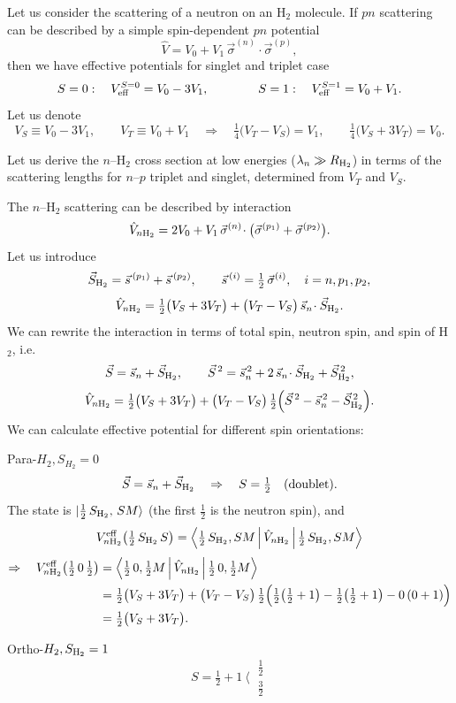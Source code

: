 \documentclass[11pt,a4paper]{article}
\newcommand{\op}[1]{\hat{#1}}
\begin{document}
Let us consider the scattering of a neutron on an H$_2$ molecule. If $pn$ scattering can be described by a simple spin-dependent $pn$ potential
\[
\op V=V_0+V_1\,\vec\sigma^{(n)}\!\cdot\vec\sigma^{(p)} , 
\]
then we have effective potentials for singlet and triplet case 
\[
S=0:\quad V_{\rm eff}^{S=0}=V_0-3V_1,
\qquad\qquad
S=1:\quad V_{\rm eff}^{S=1}=V_0+V_1 .
\]
Let us denote
\[
V_S\equiv V_0-3V_1,\qquad V_T\equiv V_0+V_1
\quad\Rightarrow\quad
\tfrac14\big(V_T-V_S\big)=V_1,\qquad
\tfrac14\big(V_S+3V_T\big)=V_0 .
\]

Let us derive the $n$--H$_2$ cross section at low energies
($\lambda_n\gg R_{\rm H_2}$) in terms of the scattering lengths for $n$--$p$
triplet and singlet, determined from $V_T$ and $V_S$.

The $n$--H$_2$ scattering can be described by interaction
\[
\op V_{n\rm H_2}=2V_0+V_1\,\vec\sigma^{(n)}\!\cdot\big(\vec\sigma^{(p_1)}+\vec\sigma^{(p_2)}\big).
\]
Let us introduce
\[
\vec S_{\rm H_2}=\vec s^{\,(p_1)}+\vec s^{\,(p_2)},
\qquad
\vec s^{\,(i)}=\tfrac12\,\vec\sigma^{(i)},\quad i=n,p_1,p_2,
\]
\[
\op V_{n\rm H_2}=\tfrac12\big(V_S+3V_T\big)+\big(V_T-V_S\big)\,\vec s_n\!\cdot\vec S_{\rm H_2} .
\]
We can rewrite the interaction in terms of total spin, neutron spin, and spin of H$_2$, i.e. 
\[
\vec S=\vec s_n+\vec S_{\rm H_2},
\qquad
\vec S^{\,2}=\vec s_n^{\,2}+2\,\vec s_n\!\cdot\vec S_{\rm H_2}+\vec S_{\rm H_2}^{\,2},
\]
\[
\op V_{n\rm H_2}=\tfrac12\big(V_S+3V_T\big)
+\big(V_T-V_S\big)\,\tfrac12\Big(\vec S^{\,2}-\vec s_n^{\,2}-\vec S_{\rm H_2}^{\,2}\Big).
\]
We can calculate effective potential for different spin orientations:

Para-$H_2, S_{H_2}=0$
\[
\vec S=\vec s_n+\vec S_{\rm H_2}\quad\Rightarrow\quad S=\tfrac12\quad\text{(doublet)}.
\]
The state is $\ket{\tfrac12\,S_{\rm H_2},\,SM}$ (the first $\tfrac12$ is the
neutron spin), and
\[
V^{\rm eff}_{n\rm H_2}\big(\tfrac12\,S_{\rm H_2}\,S\big)
=\Braket{\tfrac12\,S_{\rm H_2},SM|\op V_{n\rm H_2}|\tfrac12\,S_{\rm H_2},SM}
\]
\begin{align*}
\Rightarrow\quad
V^{\rm eff}_{n\rm H_2}\big(\tfrac12\,0\,\tfrac12\big)
&=\Braket{\tfrac12\,0,\tfrac12M|\op V_{n\rm H_2}|\tfrac12\,0,\tfrac12M}\\
&=\tfrac12\big(V_S+3V_T\big)+\big(V_T-V_S\big)\,\tfrac12\Big(\tfrac12\big(\tfrac12+1\big)
-\tfrac12\big(\tfrac12+1\big)-0\,(0+1)\Big)\\
&=\tfrac12\big(V_S+3V_T\big).
\end{align*}

Ortho-$H_2, S_{\rm H_2}=1$
\[
S=\tfrac12+1\ \Big\langle\
\begin{matrix}\tfrac12\\[1mm]\tfrac32\end{matrix}
\]
\end{document}
